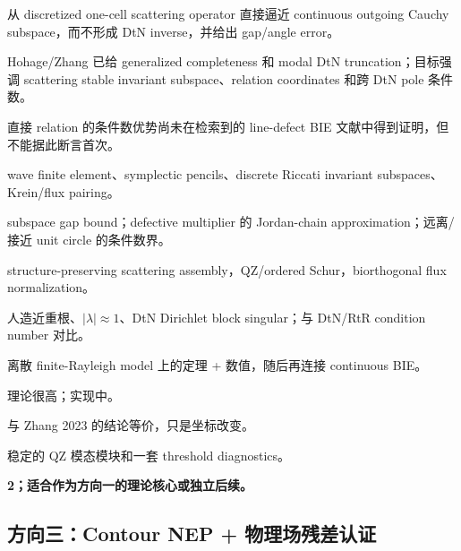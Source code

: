\documentclass[UTF8,11pt,fontset=none]{ctexart}
\begin{document}
\begin{description}[style=multiline,leftmargin=4.4cm,labelwidth=4.1cm]
  \item[核心研究问题：] 从 discretized one-cell scattering operator 直接逼近 continuous outgoing Cauchy subspace，而不形成 DtN inverse，并给出 gap/angle error。
  \item[差异：] Hohage/Zhang 已给 generalized completeness 和 modal DtN truncation；目标强调 scattering stable invariant subspace、relation coordinates 和跨 DtN pole 条件数。
  \item[创新性依据：] 直接 relation 的条件数优势尚未在检索到的 line-defect BIE 文献中得到证明，但不能据此断言首次。
  \item[继续核实：] wave finite element、symplectic pencils、discrete Riccati invariant subspaces、Krein/flux pairing。
  \item[主要定理：] subspace gap bound；defective multiplier 的 Jordan-chain approximation；远离/接近 unit circle 的条件数界。
  \item[算法：] structure-preserving scattering assembly，QZ/ordered Schur，biorthogonal flux normalization。
  \item[实验：] 人造近重根、\(|\lambda|\approx1\)、DtN Dirichlet block singular；与 DtN/RtR condition number 对比。
  \item[最小单元：] 离散 finite-Rayleigh model 上的定理 + 数值，随后再连接 continuous BIE。
  \item[难度：] 理论很高；实现中。
  \item[风险：] 与 Zhang 2023 的结论等价，只是坐标改变。
  \item[失败时保留：] 稳定的 QZ 模态模块和一套 threshold diagnostics。
  \item[优先级：] \textbf{2；适合作为方向一的理论核心或独立后续。}
\end{description}

\subsection{方向三：Contour NEP + 物理场残差认证}
\end{document}
